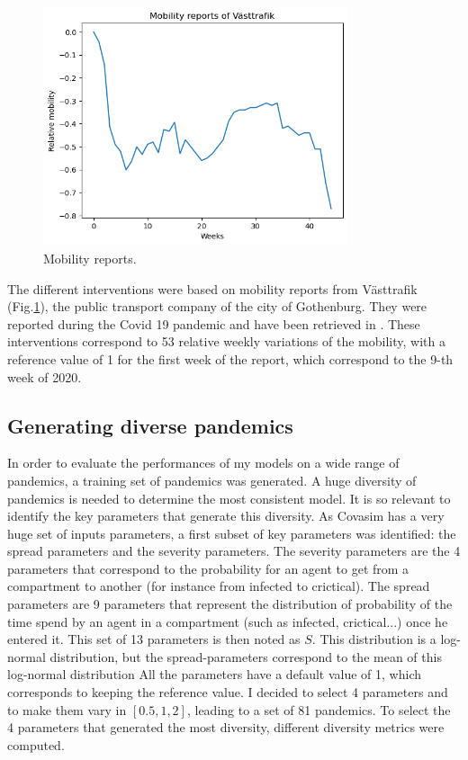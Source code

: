 \begin{figure}
    \centering
    \includegraphics[width=0.8\textwidth]{figures/mobility_reports.png}
    \caption{Mobility reports.}
    \label{fig:mobility_reports}
\end{figure}

The different interventions were based on mobility reports from Västtrafik (Fig.\ref{fig:mobility_reports}), the public transport company of the city of Gothenburg. 
They were reported during the Covid 19 pandemic and have been retrieved in \cite{gerlee2021predicting}.
These interventions correspond to 53 relative weekly variations of the mobility, with a reference value of 1 for the first week of the report, which correspond to the 9-th week of 2020. 


\subsection{Generating diverse pandemics}
\label{sec:generating_divserse_pandemics}
In order to evaluate the performances of my models on a wide range of pandemics, a training set of pandemics was generated. 
A huge diversity of pandemics is needed to determine the most consistent model.
It is so relevant to identify the key parameters that generate this diversity.
As Covasim has a very huge set of inputs parameters, a first subset of key parameters was identified: the spread parameters and the severity parameters. 
The severity parameters are the 4 parameters that correspond to the probability for an agent to get from a compartment to another (for instance from infected to crictical). 
The spread parameters are 9 parameters that represent the distribution of probability of the time spend by an agent in a compartment (such as infected, crictical...) once he entered it. 
This set of 13 parameters is then noted as $S$. 
This distribution is a log-normal distribution, but the spread-parameters correspond to the mean of this log-normal distribution
All the parameters have a default value of 1, which corresponds to keeping the reference value. 
I decided to select 4 parameters and to make them vary in $[0.5, 1, 2]$, leading to a set of 81 pandemics. 
To select the 4 parameters that generated the most diversity, different diversity metrics were computed. 

